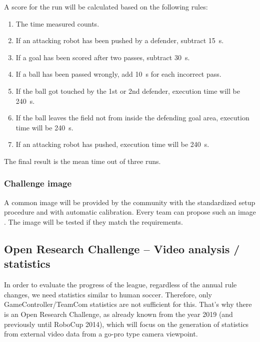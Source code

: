         A score for the run will be calculated based on the following rules:

        \begin{enumerate}
            \item The time measured counts.
            \item If an attacking robot has been pushed by a defender, subtract \qty{15}{\second}.
            \item If a goal has been scored after two passes, subtract \qty{30}{\second}.
            \item If a ball has been passed wrongly, add \qty{10}{\second} for each incorrect pass.
            \item If the ball got touched by the 1st or 2nd defender, execution time will be \qty{240}{\second}.
            \item If the ball leaves the field not from inside the defending goal area, execution time will be \qty{240}{\second}.
            \item If an attacking robot has pushed, execution time will be \qty{240}{\second}.
        \end{enumerate}

        The final result is the mean time out of three runs.

    \subsubsection{Challenge image}
        \label{sec:Challenge_image}
        A common image will be provided by the community with the standardized setup procedure and with automatic calibration. Every team can propose such an image . The image will be tested if they match the requirements.

\subsection{Open Research Challenge -- Video analysis / statistics}
In order to evaluate the progress of the league, regardless of the annual rule changes, we need statistics similar to human soccer. Therefore, only GameController/TeamCom statistics are not sufficient for this. That's why there is an Open Research Challenge, as already known from the year 2019 (and previously until RoboCup 2014), which will focus on the generation of statistics from external video data from a go-pro type camera viewpoint.

